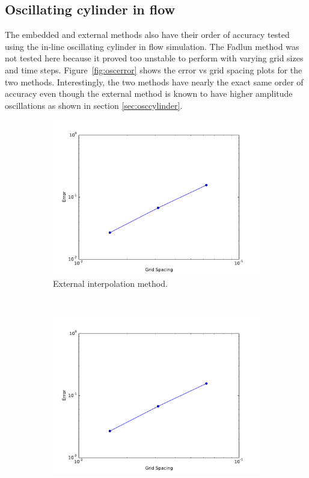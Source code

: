 \documentclass[onehalf,11pt]{beavtex}
\begin{document}
\subsection{Oscillating cylinder in flow}
The embedded and external methods also have their order of accuracy tested using the in-line oscillating cylinder in flow simulation.
The Fadlun method was not tested here because it proved too unstable to perform with varying grid sizes and time steps.
Figure~\ref{fig:oscerror} shows the error vs grid spacing plots for the two methods. 
Interestingly, the two methods have nearly the exact same order of accuracy even though the external method is known to have higher amplitude oscillations as shown in section \ref{sec:osccylinder}. 

\begin{figure}[!htb]
	\centering
	\begin{subfigure}{0.4\textwidth}
		\includegraphics[width=\linewidth]{oscerrorexternal}
		\caption{External interpolation method.}
	\end{subfigure}
	~
	\begin{subfigure}{0.4\textwidth}
		\includegraphics[width=\linewidth]{oscerrorembedded}

\end{subfigure}
\end{figure}
\end{document}
